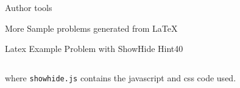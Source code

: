 \documentclass[12pt]{article}
\begin{document}
\begin{edXchapter}{Author tools}
\begin{edXsection}{More Sample problems generated from LaTeX}
\begin{edXsequential}
\begin{edXproblem}{Latex Example Problem with ShowHide Hint}{40}
\begin{verbatim}
\end{verbatim}

where {\tt showhide.js} contains the javascript and css code used.

\end{edXproblem}


\end{edXsequential}

\end{edXsection}
\end{edXchapter}

\end{document}
